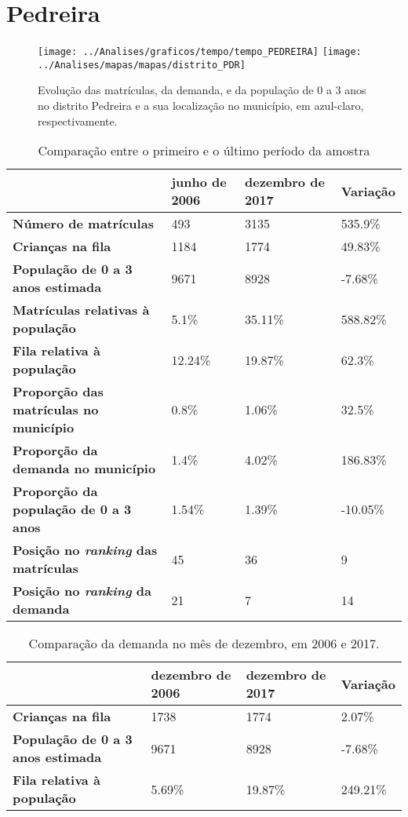 \section{Pedreira}
\begin{figure}[H]
\centering
\texttt{[image: ../Analises/graficos/tempo/tempo\_PEDREIRA]}
\texttt{[image: ../Analises/mapas/mapas/distrito\_PDR]}
\caption{Evolução das matrículas, da demanda, e da população de 0 a 3 anos no distrito Pedreira e a sua localização no município, em azul-claro, respectivamente.}
\end{figure}
\begin{table}[H]
\begin{tabular}{l|l|l|l}
\textbf{}                                      & \textbf{junho de 2006}       & \textbf{dezembro de 2017}    & \textbf{Variação} \\ \hline
\textbf{Número de matrículas}                  & 493 & 3135 & 535.9\% \\ \hline
\textbf{Crianças na fila}                      & 1184 & 1774 & 49.83\% \\ \hline
\textbf{População de 0 a 3 anos estimada}      & 9671 & 8928 & -7.68\% \\ \hline
\textbf{Matrículas relativas à população}      & 5.1\% & 35.11\% & 588.82\% \\ \hline
\textbf{Fila relativa à população}             & 12.24\% & 19.87\% & 62.3\% \\ \hline
\textbf{Proporção das matrículas no município} & 0.8\% & 1.06\% & 32.5\% \\ \hline
\textbf{Proporção da demanda no município}     & 1.4\% & 4.02\% & 186.83\% \\ \hline
\textbf{Proporção da população de 0 a 3 anos}  & 1.54\% & 1.39\% & -10.05\% \\ \hline
\textbf{Posição no \textit{ranking} das matrículas}     & 45 & 36 & 9 \\ \hline
\textbf{Posição no \textit{ranking} da demanda}         & 21 & 7 & 14 \\ 
\end{tabular}
\caption{Comparação entre o primeiro e o último período da amostra}
\end{table}
\begin{table}[H]
\begin{tabular}{l|l|l|l}
\textbf{}                                 & \textbf{dezembro de 2006} & \textbf{dezembro de 2017} & \textbf{Variação} \\ \hline
\textbf{Crianças na fila}                      & 1738 & 1774 & 2.07\% \\ \hline
\textbf{População de 0 a 3 anos estimada}      & 9671 & 8928 & -7.68\% \\ \hline
\textbf{Fila relativa à população}             & 5.69\% & 19.87\% & 249.21\% \\
\end{tabular}
\caption{Comparação da demanda no mês de dezembro, em 2006 e 2017.}
\end{table}
